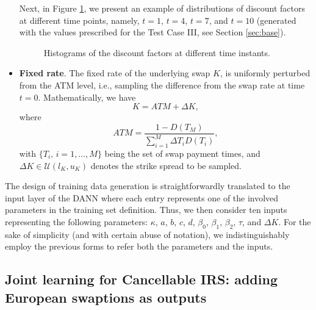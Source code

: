 \begin{itemize}
            Next, in Figure \ref{fig:DF_hist}, we present an example of distributions of discount factors at different time points, namely, $t=1$, $t=4$, $t=7$, and $t=10$ (generated with the values prescribed for the Test Case III, see Section \ref{sec:base}).
            \begin{figure}[h!]
                \centering
                \caption{Histograms of the discount factors at different time instants.}
                \label{fig:DF_hist}
            \end{figure}
    
            \item \textbf{Fixed rate}. The fixed rate of the underlying swap $K$, is uniformly perturbed from the ATM level, i.e., sampling the difference from the swap rate at time $t = 0$. Mathematically, we have
            \begin{equation*}
                K = ATM + \Delta K,
            \end{equation*}
            where
            \begin{equation*}
                ATM = \frac{1 - D(T_M)}{\sum_{i=1}^M\Delta T_i D(T_i)},
            \end{equation*} 
            with $\{T_i,\, i = 1,\dots, M\}$ being the set of swap payment times, and $\Delta K \in \mathcal{U}(l_{K}, u_{K})$ denotes the strike spread to be sampled.
        \end{itemize}

        The design of training data generation is straightforwardly translated to the input layer of the DANN where each entry represents one of the involved parameters in the training set definition. Thus, we then consider ten inputs representing the following parameters: $\kappa$, $a$, $b$, $c$, $d$, $\beta_0$, $\beta_1$, $\beta_2$, $\tau$, and $\Delta K$. For the sake of simplicity (and with certain abuse of notation), we indistinguishably employ the previous forms to refer both the parameters and the inputs.


    \subsection{Joint learning for Cancellable IRS: adding European swaptions as outputs}\label{sec:joint_learning}
        
